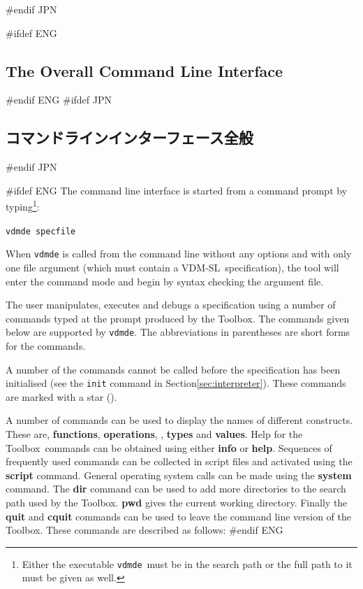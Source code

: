 \documentclass[\pformat,12pt]{article}
\newcommand{\vdmslpp}{VDM-SL}
\newcommand{\Toolbox}{Toolbox}
\newcommand{\vdmde}{vdmde}
\newcommand{\vdmslpp}{VDM++}
\newcommand{\Toolbox}{Toolbox}
\newcommand{\vdmde}{vppde}
\newcommand{\cmd}{\tt }
\newcommand{\guicmd}[1]{{\sf #1}}
\newcommand{\guicmd}[1]{{\gt #1}}
\begin{document}
\begin{description}
#endif JPN
\end{description}


#ifdef ENG
\subsection{The Overall Command Line Interface}\label{subsec:maincommand}
#endif ENG
#ifdef JPN
\subsection{コマンドラインインターフェース全般}\label{subsec:maincommand}
#endif JPN

#ifdef ENG
The command line interface is started from a command prompt by
typing\footnote{Either the executable {\tt \vdmde}\ must be in the
  search path or the full path to it must be given as well.}:

{\tt \vdmde\ specfile}

When {\tt \vdmde} is called from the command line without any options
and with only one file argument (which must contain a \vdmslpp\ 
specification), the tool will enter the command mode and begin by
syntax checking the argument file.

The user manipulates, executes and debugs a specification using a
number of commands typed at the prompt produced by the \Toolbox.  The
commands given below are supported by {\tt \vdmde}.  The abbreviations
in parentheses are short forms for the commands.

A number of the commands cannot be called before the specification has
been initialised (see the {\cmd init} command in
Section\ref{sec:interpreter}).  These commands are marked with a star
({\tt *}).

A number of commands can be used to display the names of different
constructs. These are,
\textbf{functions}, \textbf{operations},
,
\textbf{types} and \textbf{values}.  Help for the \Toolbox\ commands
can be obtained using either \textbf{info} or \textbf{help}. Sequences
of frequently used commands can be collected in script files and
activated using the \textbf{script} command. General operating system
calls can be made using the \textbf{system} command. The \textbf{dir}
command can be used to add more directories to the search path used by
the \Toolbox. \textbf{pwd} gives the current
working directory. Finally the \textbf{quit} and \textbf{cquit}
commands can be used to leave the command line version of the
\Toolbox.  These commands are described as follows:
#endif ENG
\end{document}
